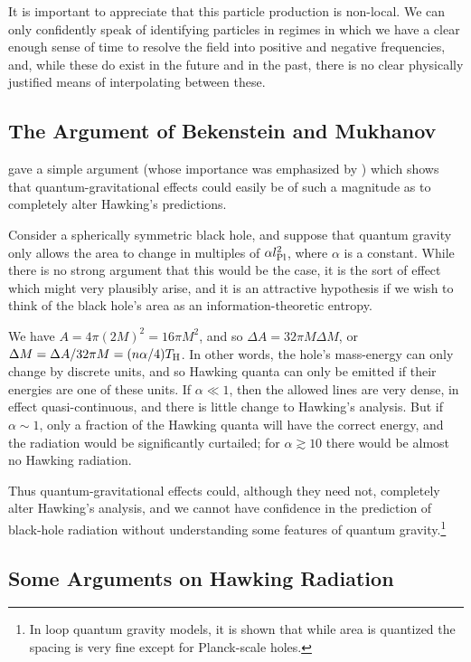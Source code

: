 \documentclass[
%
draft    %
,numberedheadings 
,bibliocites
  ]
  {aipproc}
\begin{document}
It is important to appreciate that this particle production is non-local.  We can only confidently speak of identifying particles in regimes in which we have a clear enough sense of time to resolve the field into positive and negative frequencies, and, while these do exist in the future and in the past, there is no clear physically justified means of interpolating between these.


\subsection{The Argument of Bekenstein and Mukhanov}

\citet{Bekenstein:1995ju} gave a simple argument (whose importance was emphasized by \citet{Ashtekar:1998}) which shows that quantum-gravitational effects could easily be of such a magnitude as to completely alter Hawking's predictions.

Consider a spherically symmetric black hole, and suppose that quantum gravity only allows the area to change in multiples of $\alpha l_{\rm Pl}^2$, where $\alpha$ is a constant.  While there is no strong argument that this would be the case, it is the sort of effect which might very plausibly arise, and it is an attractive hypothesis if we wish to think of the black hole's area as an information-theoretic entropy.

We have $A=4\pi (2M)^2=16\pi M^2$, and so $\Delta A=32\pi M\Delta M$, or $\Delta M=\Delta A/32\pi M=(n\alpha /4)T_{\rm H}$.  In other words, the hole's mass-energy can only change by discrete units, and so Hawking quanta can only be emitted if their energies are one of these units.  If $\alpha\ll 1$, then the allowed lines are very dense, in effect quasi-continuous, and there is little change to Hawking's analysis.  But if $\alpha \sim 1$, only a fraction of the Hawking quanta will have the correct energy, and the radiation would be significantly curtailed; for $\alpha\gtrsim 10$ there would be almost no Hawking radiation.

Thus quantum-gravitational effects could, although they need not, completely alter Hawking's analysis, and we cannot have confidence in the prediction of black-hole radiation without understanding some features of quantum gravity.\footnote{In loop quantum gravity models, it is shown that while area is quantized the spacing is very fine except for Planck-scale holes.}

\subsection{Some Arguments on Hawking Radiation}
\end{document}
